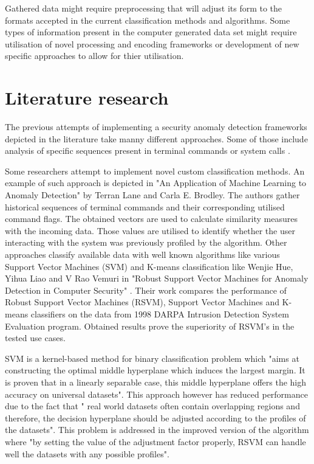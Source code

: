 \documentclass[a4paper,twoside,12pt]{book}
\begin{document}
Gathered data might require preprocessing that will adjust its form to the formats accepted in the
current classification methods and algorithms. Some types of information present in the computer 
generated data set might require utilisation of novel processing and encoding frameworks or 
development of new specific approaches to allow for thier utilisation.  

\section{Literature research}

The previous attempts of implementing a security anomaly detection frameworks depicted in the 
literature take manny different approaches. Some of those include analysis of specific sequences
present in terminal commands \cite{bib:lane1997application} or system calls \cite{bib:forest}. 

Some researchers attempt to implement novel custom classification methods. An example of such 
approach is depicted in "An Application of Machine Learning to Anomaly Detection" by Terran Lane 
and Carla E. Brodley\cite{bib:lane1997application}. The authors gather historical sequences of
terminal commands and their corresponding utilised command flags. The obtained vectors are used
to calculate similarity measures with the incoming data. Those values are utilised to identify 
whether the user interacting with the system was previously profiled by the algorithm.
Other approaches classify available data with well known algorithms like various Support Vector 
Machines (SVM) and K-means classification like Wenjie Hue, Yihua Liao and V Rao Vemuri in "Robust Support Vector 
Machines for Anomaly Detection in Computer Security" \cite{bib:rsvm}. Their work compares the 
performance of Robust Support Vector Machines (RSVM), Support Vector Machines and K-means classifiers
on the data from 1998 DARPA Intrusion Detection System Evaluation program. Obtained results
prove the superiority of RSVM's in the tested use cases. 

SVM is a kernel-based method for binary classification problem which "aims at constructing 
the optimal middle hyperplane which induces the largest margin. It is proven that in a linearly 
separable case, this middle hyperplane offers the high accuracy on universal datasets". This 
approach however has reduced performance due to the fact that " real world datasets often contain 
overlapping regions and therefore, the decision hyperplane should be adjusted according to the 
profiles of the datasets". This problem is addressed in the improved version of the algorithm
where "by setting the value of the adjustment factor properly, RSVM can handle well the datasets 
with any possible profiles"\cite{bib:svmandrsvm}.
\end{document}
